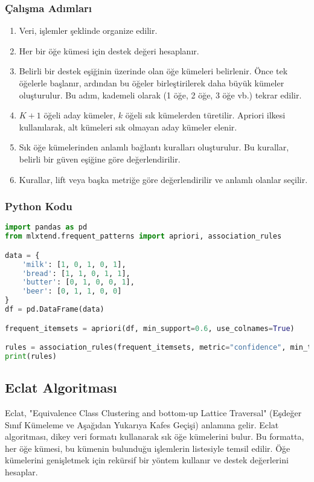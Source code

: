 \subsubsection{Çalışma Adımları}

\begin{enumerate}
	\item Veri, işlemler şeklinde organize edilir.
	\item Her bir öğe kümesi için destek değeri hesaplanır.
	\item Belirli bir destek eşiğinin üzerinde olan öğe kümeleri belirlenir. Önce tek öğelerle başlanır, ardından bu öğeler birleştirilerek daha büyük kümeler oluşturulur. Bu adım, kademeli olarak (1 öğe, 2 öğe, 3 öğe vb.) tekrar edilir.
	\item $K+1$ öğeli aday kümeler, $k$ öğeli sık kümelerden türetilir. Apriori ilkesi kullanılarak, alt kümeleri sık olmayan aday kümeler elenir.
	\item Sık öğe kümelerinden anlamlı bağlantı kuralları oluşturulur. Bu kurallar, belirli bir güven eşiğine göre değerlendirilir.
	\item Kurallar, lift veya başka metriğe göre değerlendirilir ve anlamlı olanlar seçilir.
\end{enumerate}

\subsubsection{Python Kodu}

\begin{lstlisting}[language=Python]
import pandas as pd
from mlxtend.frequent_patterns import apriori, association_rules

data = {
    'milk': [1, 0, 1, 0, 1],
    'bread': [1, 1, 0, 1, 1],
    'butter': [0, 1, 0, 0, 1],
    'beer': [0, 1, 1, 0, 0]
}
df = pd.DataFrame(data)

frequent_itemsets = apriori(df, min_support=0.6, use_colnames=True)

rules = association_rules(frequent_itemsets, metric="confidence", min_threshold=0.7)
print(rules)
\end{lstlisting}

\newpage

\subsection{Eclat Algoritması}
Eclat, "Equivalence Class Clustering and bottom-up Lattice Traversal" (Eşdeğer Sınıf Kümeleme ve Aşağıdan Yukarıya Kafes Geçişi) anlamına gelir. Eclat algoritması, dikey veri formatı kullanarak sık öğe kümelerini bulur. Bu formatta, her öğe kümesi, bu kümenin bulunduğu işlemlerin listesiyle temsil edilir. Öğe kümelerini genişletmek için rekürsif bir yöntem kullanır ve destek değerlerini hesaplar.


